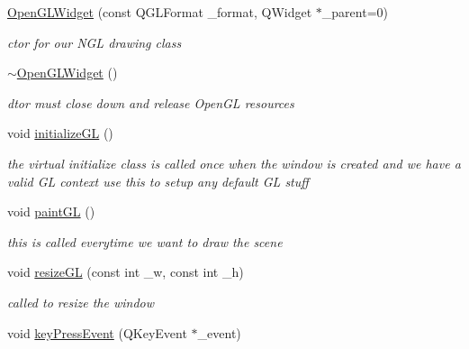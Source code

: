 \begin{DoxyCompactItemize}
\item 
\hyperlink{class_open_g_l_widget_a60b9008fd7762190918d5e2528a57248}{Open\-G\-L\-Widget} (const Q\-G\-L\-Format \-\_\-format, Q\-Widget $\ast$\-\_\-parent=0)
\begin{DoxyCompactList}\small\item\em ctor for our N\-G\-L drawing class \end{DoxyCompactList}\item 
\hypertarget{class_open_g_l_widget_a293847f6a7e6c40344a1acfca3e9eb51}{\hyperlink{class_open_g_l_widget_a293847f6a7e6c40344a1acfca3e9eb51}{$\sim$\-Open\-G\-L\-Widget} ()}\label{class_open_g_l_widget_a293847f6a7e6c40344a1acfca3e9eb51}

\begin{DoxyCompactList}\small\item\em dtor must close down and release Open\-G\-L resources \end{DoxyCompactList}\item 
\hypertarget{class_open_g_l_widget_a570df546f7206455c57addb624906576}{void \hyperlink{class_open_g_l_widget_a570df546f7206455c57addb624906576}{initialize\-G\-L} ()}\label{class_open_g_l_widget_a570df546f7206455c57addb624906576}

\begin{DoxyCompactList}\small\item\em the virtual initialize class is called once when the window is created and we have a valid G\-L context use this to setup any default G\-L stuff \end{DoxyCompactList}\item 
\hypertarget{class_open_g_l_widget_a260a543726f601659cbd1809b90f9e4b}{void \hyperlink{class_open_g_l_widget_a260a543726f601659cbd1809b90f9e4b}{paint\-G\-L} ()}\label{class_open_g_l_widget_a260a543726f601659cbd1809b90f9e4b}

\begin{DoxyCompactList}\small\item\em this is called everytime we want to draw the scene \end{DoxyCompactList}\item 
\hypertarget{class_open_g_l_widget_a55cf4659a7f10207fb6ab3fcf9273abc}{void \hyperlink{class_open_g_l_widget_a55cf4659a7f10207fb6ab3fcf9273abc}{resize\-G\-L} (const int \-\_\-w, const int \-\_\-h)}\label{class_open_g_l_widget_a55cf4659a7f10207fb6ab3fcf9273abc}

\begin{DoxyCompactList}\small\item\em called to resize the window \end{DoxyCompactList}\item 
\hypertarget{class_open_g_l_widget_a2e7ec0372fb6b2a0eb85a9524cfdd7fd}{void \hyperlink{class_open_g_l_widget_a2e7ec0372fb6b2a0eb85a9524cfdd7fd}{key\-Press\-Event} (Q\-Key\-Event $\ast$\-\_\-event)}\label{class_open_g_l_widget_a2e7ec0372fb6b2a0eb85a9524cfdd7fd}


\end{DoxyCompactItemize}
